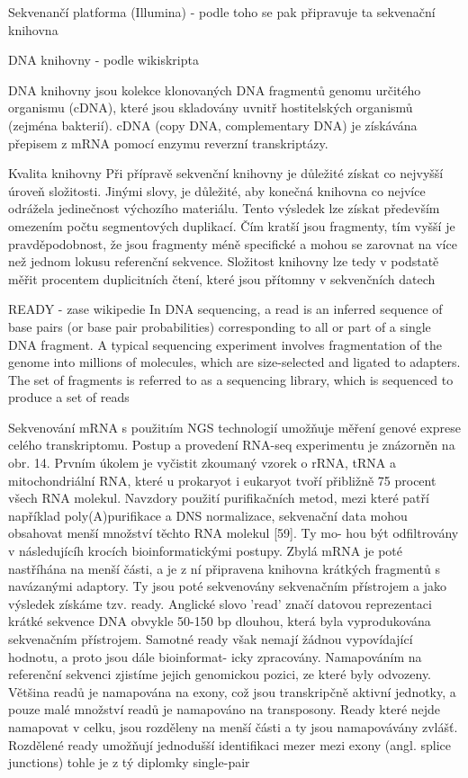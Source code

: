 \documentclass[czech,DP]{thesiskiv}
\begin{document}
Sekvenančí platforma (Illumina) - podle toho se pak připravuje ta sekvenační knihovna


DNA knihovny - podle wikiskripta

DNA knihovny jsou kolekce klonovaných DNA fragmentů genomu určitého organismu (cDNA), které jsou skladovány uvnitř hostitelských organismů (zejména bakterií). cDNA (copy DNA, complementary DNA) je získávána přepisem z mRNA pomocí enzymu reverzní transkriptázy.

Kvalita knihovny
Při přípravě sekvenční knihovny je důležité získat co nejvyšší úroveň složitosti. Jinými slovy, je důležité, aby konečná knihovna co nejvíce odrážela jedinečnost výchozího materiálu. Tento výsledek lze získat především omezením počtu segmentových duplikací. Čím kratší jsou fragmenty, tím vyšší je pravděpodobnost, že jsou fragmenty méně specifické a mohou se zarovnat na více než jednom lokusu referenční sekvence. Složitost knihovny lze tedy v podstatě měřit procentem duplicitních čtení, které jsou přítomny v sekvenčních datech

READY - zase wikipedie
In DNA sequencing, a read is an inferred sequence of base pairs (or base pair probabilities) corresponding to all or part of a single DNA fragment. A typical sequencing experiment involves fragmentation of the genome into millions of molecules, which are size-selected and ligated to adapters. The set of fragments is referred to as a sequencing library, which is sequenced to produce a set of reads

Sekvenování mRNA s použitıím NGS technologií umožňuje měření genové exprese celého
transkriptomu. Postup a provedení RNA-seq experimentu je znázorněn na obr. 14.
Prvním úkolem je vyčistit zkoumaný vzorek o rRNA, tRNA a mitochondriální RNA,
které u prokaryot i eukaryot tvoří přibližně 75 procent všech RNA molekul. Navzdory použití
purifikačních metod, mezi které patří například poly(A)purifikace a DNS normalizace,
sekvenační data mohou obsahovat menší množství těchto RNA molekul [59]. Ty mo-
hou být odfiltrovány v následujícíh krocích bioinformatickými postupy. Zbylá mRNA
je poté nastříhána na menší části, a je z ní připravena knihovna krátkých fragmentů s
navázanými adaptory. Ty jsou poté sekvenovány sekvenačním přístrojem a jako výsledek
získáme tzv. ready. Anglické slovo ’read’ značí datovou reprezentaci krátké sekvence
DNA obvykle 50-150 bp dlouhou, která byla vyprodukována sekvenačním přístrojem.
Samotné ready však nemají žádnou vypovídající hodnotu, a proto jsou dále bioinformat-
icky zpracovány. Namapováním na referenční sekvenci zjistíme jejich genomickou pozici,
ze které byly odvozeny. Většina readů je namapována na exony, což jsou transkripčně
aktivní jednotky, a pouze malé množství readů je namapováno na transposony. Ready
které nejde namapovat v celku, jsou rozděleny na menší části a ty jsou namapovávány
zvlášť. Rozdělené ready umožňují jednodušší identifikaci mezer mezi exony (angl. splice
junctions)
tohle je z tý diplomky single-pair
\end{document}
